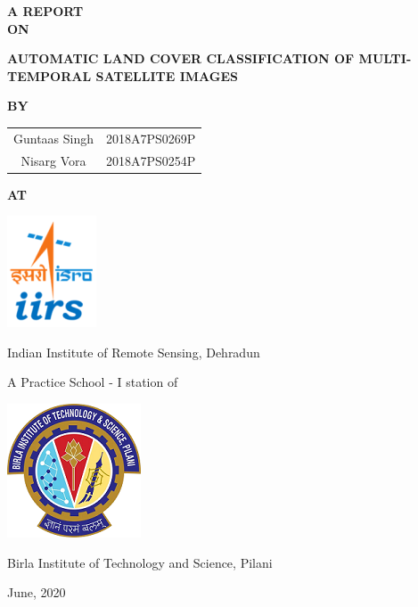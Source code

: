 \documentclass[12pt, a4paper]{report}
\begin{document}
\pagestyle{empty}
\begin{titlepage}
\vspace*{0.2cm}
\begin{center} \textbf{A REPORT\\ON} \end{center}
\begin{center} \textbf{{\Large AUTOMATIC LAND COVER CLASSIFICATION OF MULTI-TEMPORAL SATELLITE IMAGES}} \end{center}
\begin{center} \textbf{BY} \end{center}
\begin{center} 
{\Large 
	\begin{tabular}{c c}
	Guntaas Singh & 2018A7PS0269P\\
	Nisarg Vora & 2018A7PS0254P
	\end{tabular}
}
\end{center}
\begin{center} \textbf{AT} \end{center}
\begin{center} \includegraphics{iirs.png} \end{center}
\begin{center} {\Large Indian Institute of Remote Sensing, Dehradun} \end{center}
\begin{center} A Practice School - I station of \end{center}
\begin{center} {\includegraphics{bits.png}} \end{center}
\begin{center} {\Large Birla Institute of Technology and Science, Pilani} \end{center}
\begin{center} June, 2020 \end{center}
\end{titlepage}
\pagebreak
\end{document}
